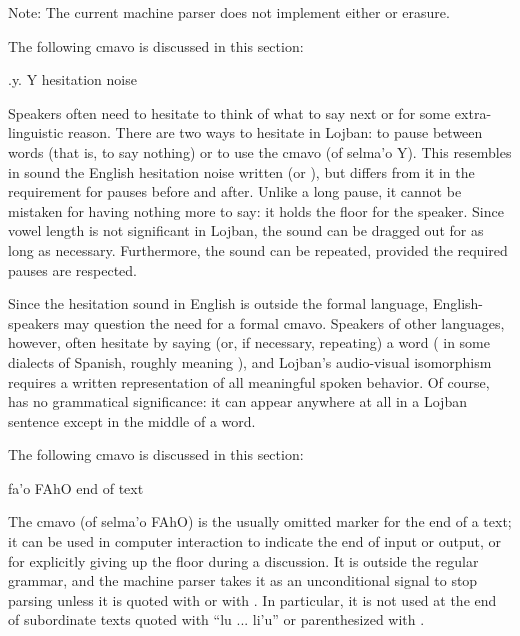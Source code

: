 Note: The current machine parser does not implement either
     or  erasure.



The following cmavo is discussed in this section:

   .y. Y   hesitation noise

Speakers often need to hesitate to think of what to say next or
    for some extra-linguistic reason. There are two ways to
    hesitate in Lojban: to pause between words (that is, to say
    nothing) or to use the cmavo  (of selma'o Y). This
    resembles in sound the English hesitation noise written 
    (or ), but differs from it in the requirement for pauses
    before and after. Unlike a long pause, it cannot be mistaken
    for having nothing more to say: it holds the floor for the
    speaker. Since vowel length is not significant in Lojban, the
     sound can be dragged out for as long as necessary.
    Furthermore, the sound can be repeated, provided the required
    pauses are respected. 

Since the hesitation sound in English is outside the formal
    language, English-speakers may question the need for a formal
    cmavo. Speakers of other languages, however, often hesitate by
    saying (or, if necessary, repeating) a word ( in some
    dialects of Spanish, roughly meaning ), and Lojban's
    audio-visual isomorphism requires a written representation of
    all meaningful spoken behavior. Of course,  has no
    grammatical significance: it can appear anywhere at all in a
    Lojban sentence except in the middle of a word.



The following cmavo is discussed in this section:

   fa'o    FAhO    end of text

The cmavo  (of selma'o FAhO) is the usually omitted
    marker for the end of a text; it can be used in computer
    interaction to indicate the end of input or output, or for
    explicitly giving up the floor during a discussion. It is
    outside the regular grammar, and the machine parser takes it as
    an unconditional signal to stop parsing unless it is quoted
    with  or with . In particular, it is not
    used at the end of subordinate texts quoted with ``lu ...
    li'u'' or parenthesized with .



